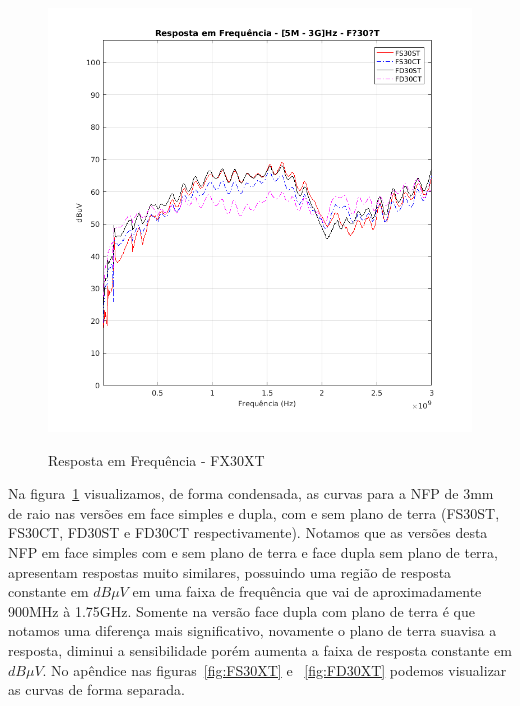 \begin{figure}[htb!]
	\centering 
	\caption{Resposta em Frequência - FX30XT}
	\includegraphics[scale=0.7]{./img/FX30XT}
	\label{fig:FX30XT}
\end{figure}

Na figura~\ref{fig:FX30XT} visualizamos, de forma condensada, as curvas para a NFP de 3mm de raio nas versões em face simples e dupla, com e sem plano de terra (FS30ST, FS30CT, FD30ST e FD30CT respectivamente). Notamos que as versões desta NFP em face simples com e sem plano de terra e face dupla sem plano de terra, apresentam respostas muito similares, possuindo uma região de resposta constante em $dB \mu V$ em uma faixa de frequência que vai de aproximadamente 900MHz à 1.75GHz. Somente na versão face dupla com plano de terra é que notamos uma diferença mais significativo, novamente o plano de terra suavisa a resposta, diminui a sensibilidade porém aumenta a faixa de resposta constante em $dB \mu V$. No apêndice nas figuras~\ref{fig:FS30XT} e ~\ref{fig:FD30XT} podemos visualizar as curvas de forma separada.

